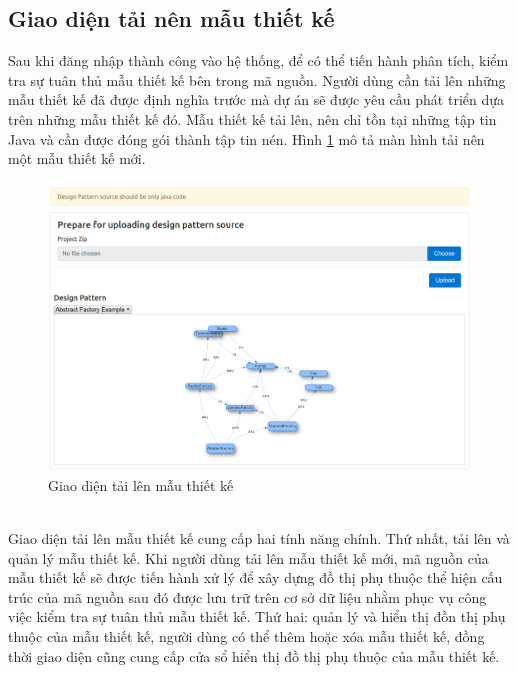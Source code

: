 \documentclass[12pt]{report}
\begin{document}
\subsection{Giao diện tải nên mẫu thiết kế}
Sau khi đăng nhập thành công vào hệ thống, để có thể tiến hành phân tích, kiểm tra sự tuân thủ mẫu thiết kế bên trong mã nguồn. Người dùng cần tải lên những mẫu thiết kế đã được định nghĩa trước mà dự án sẽ được yêu cầu phát triển dựa trên những mẫu thiết kế đó. Mẫu thiết kế tải lên, nên chỉ tồn tại những tập tin Java và cần được đóng gói thành tập tin nén. Hình \ref{fig:ds_upload_example} mô tả màn hình tải nên một mẫu thiết kế mới.
\begin{figure}[!htbp]
	\centering
	\includegraphics[scale=0.36]{images/ds_upload_example}
	\caption{Giao diện tải lên mẫu thiết kế}
	\label{fig:ds_upload_example}
\end{figure}\\
Giao diện tải lên mẫu thiết kế cung cấp hai tính năng chính. Thứ nhất, tải lên và quản lý mẫu thiết kế. Khi người dùng tải lên mẫu thiết kế mới, mã nguồn của mẫu thiết kế sẽ được tiến hành xử lý để xây dựng đồ thị phụ thuộc thể hiện cấu trúc của mã nguồn sau đó được lưu trữ trên cơ sở dữ liệu nhằm phục vụ công việc kiểm tra sự tuân thủ mẫu thiết kế. Thứ hai: quản lý và hiển thị đồn thị phụ thuộc của mẫu thiết kế, người dùng có thể thêm hoặc xóa mẫu thiết kế, đồng thời giao diện cũng cung cấp cửa sổ hiển thị đồ thị phụ thuộc của mẫu thiết kế.
\end{document}
